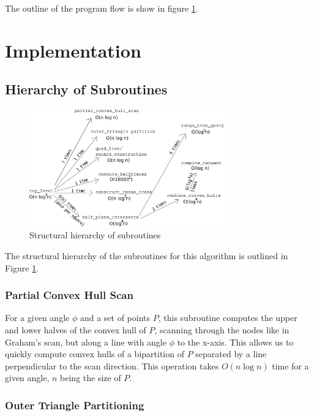 \documentclass{article}
\newcommand{\figref}[1]{Figure \ref{#1}}
\begin{document}
The outline of the program flow is show in figure \ref{fig:hierarchy}.

\section{Implementation}

\subsection{Hierarchy of Subroutines}

\begin{figure}[ht]
    \centering
    \includegraphics[width=0.75\textwidth]{hierarchy.png}
    \caption{Structural hierarchy of subroutines}
    \label{fig:hierarchy}
\end{figure}

The structural hierarchy of the subroutines for this algorithm is outlined in \figref{fig:hierarchy}.

\subsubsection{Partial Convex Hull Scan}

For a given angle $\phi$ and a set of points $P$, this subroutine computes the upper and lower halves of the convex hull of $P$, scanning through the nodes like in Graham's scan, but along a line with angle $\phi$ to the x-axis. This allows us to quickly compute convex hulls of a bipartition of $P$ separated by a line perpendicular to the scan direction. This operation takes $O(n \log n)$ time for a given angle, $n$ being the size of $P$.

\subsubsection{Outer Triangle Partitioning} \label{subsub:outer_triangle_partitioning}
\end{document}
